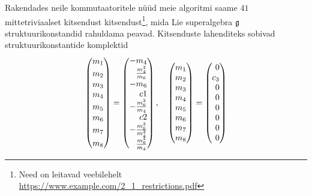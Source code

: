 Rakendades neile kommutaatoritele nüüd meie algoritmi saame $41$
mittetriviaalset kitsendust kitsendust\footnote{Need on leitavad veebilehelt
\url{https://www.example.com/2_1_restrictions.pdf}},
mida Lie superalgebra $\mathfrak{g}$ struktuurikonstandid rahuldama peavad. Kitsenduste
lahenditeks sobivad struktuurikonstantide komplektid
\renewcommand\arraystretch{1.2}
\begin{align*}
    \begin{pmatrix}
        m_1 \\
        m_2 \vphantom{\frac{m_4^2}{m_6}} \\
        m_3 \\
        m_4 \\
        m_5 \vphantom{\frac{m_4^2}{m_6}} \\
        m_6 \\
        m_7 \vphantom{\frac{m_4^2}{m_6}} \\
        m_8 \vphantom{\frac{m_4^2}{m_6}}
    \end{pmatrix}
    =
    \begin{pmatrix*}[r]
        -m_4 \\
        \frac{m_4^2}{m_6} \\
        -m_6 \\
        c1 \\
        -\frac{m_6^2}{m_4} \\
        c2 \\
        -\frac{m_6^3}{m_4^2} \\
        \frac{m_6^2}{m_4}
    \end{pmatrix*},
    \quad
    \begin{pmatrix}
        m_1 \\
        m_2 \\
        m_3 \\
        m_4 \\
        m_5 \\
        m_6 \\
        m_7 \\
        m_8
    \end{pmatrix}
    =
    \begin{pmatrix*}[r]
        0 \\
        c_3 \\
        0 \\
        0 \\
        0 \\
        0 \\
        0 \\
        0

\end{pmatrix*}
\end{align*}
